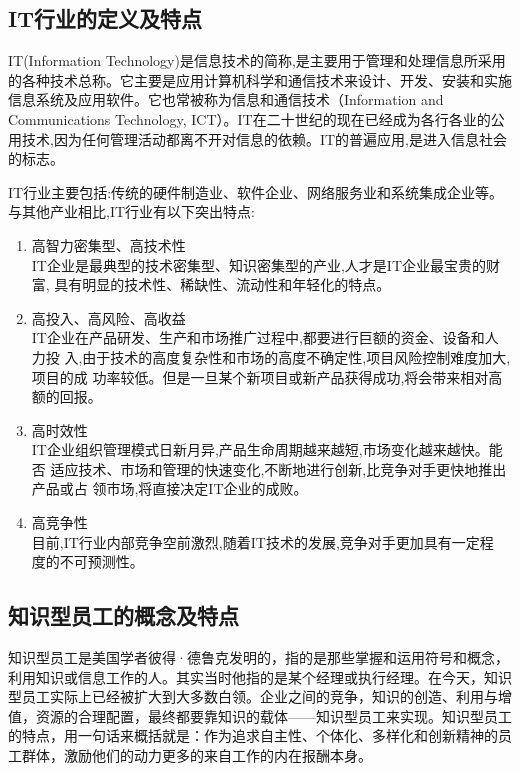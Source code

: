 \documentclass[10pt,a4paper]{article}
\begin{document}
\begin{CJK*}{UTF8}{gkai}
\subsection{IT行业的定义及特点}
IT(Information Technology)是信息技术的简称,是主要用于管理和处理信息所采用的各种技术总称。它主要是应用计算机科学和通信技术来设计、开发、安装和实施信息系统及应用软件。它也常被称为信息和通信技术（Information and Communications Technology, ICT）\cite{1}。IT在二十世纪的现在已经成为各行各业的公用技术,因为任何管理活动都离不开对信息的依赖。IT的普遍应用,是进入信息社会的标志。

IT行业主要包括:传统的硬件制造业、软件企业、网络服务业和系统集成企业等。与其他产业相比,IT行业有以下突出特点:
\begin{enumerate}
\item 高智力密集型、高技术性\\
IT企业是最典型的技术密集型、知识密集型的产业,人才是IT企业最宝贵的财富,
具有明显的技术性、稀缺性、流动性和年轻化的特点。
\item 高投入、高风险、高收益\\
IT企业在产品研发、生产和市场推广过程中,都要进行巨额的资金、设备和人力投
入,由于技术的高度复杂性和市场的高度不确定性,项目风险控制难度加大,项目的成
功率较低。但是一旦某个新项目或新产品获得成功,将会带来相对高额的回报。
\item 高时效性\\
IT企业组织管理模式日新月异,产品生命周期越来越短,市场变化越来越快。能否
适应技术、市场和管理的快速变化,不断地进行创新,比竞争对手更快地推出产品或占
领市场,将直接决定IT企业的成败。
\item 高竞争性\\
目前,IT行业内部竞争空前激烈,随着IT技术的发展,竞争对手更加具有一定程
度的不可预测性。
\end{enumerate}


\subsection{知识型员工的概念及特点}
知识型员工是美国学者彼得·德鲁克发明的，指的是那些掌握和运用符号和概念，利用知识或信息工作的人。其实当时他指的是某个经理或执行经理。在今天，知识型员工实际上已经被扩大到大多数白领。企业之间的竞争，知识的创造、利用与增值，资源的合理配置，最终都要靠知识的载体——知识型员工来实现。知识型员工的特点，用一句话来概括就是：作为追求自主性、个体化、多样化和创新精神的员工群体，激励他们的动力更多的来自工作的内在报酬本身。\cite{2}



\end{CJK*}
\end{document}
